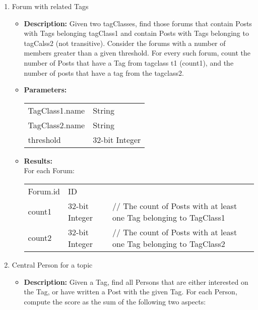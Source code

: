 {\begin{enumerate}
      \item Forum with related Tags 
            \begin{itemize}
                \item \textbf{Description:}
                  Given two tagClasses, find those forums that contain Posts with Tags belonging tagClass1 and contain
                  Posts with Tags belonging to tagCalss2 (not transitive). Consider the forums with a number of members
                  greater than a given threshold.
                  For every such forum, count the number of Posts  that have a Tag from tagclass t1 (count1), and the
                  number of posts that have a tag  from the tagclass2. 
                \item \textbf{Parameters:} \\
                    \begin{tabular}{ll}
                      TagClass1.name & String \\ 
                      TagClass2.name & String \\ 
                      threshold & 32-bit Integer \\
                    \end{tabular}
                \item \textbf{Results:} \\
                  For each Forum:
                    \begin{tabular}{lll}
                      Forum.id & ID & \\
                      count1 & 32-bit Integer & \parbox[t]{20cm}{ // The count of Posts with at least one Tag belonging
                        to TagClass1 \strut} \\
                      count2 & 32-bit Integer & \parbox[t]{20cm}{ // The count of Posts with at least one Tag belonging
                        to TagClass2 \strut} \\
                    \end{tabular}
                    \end{itemize}

      \item Central Person for a topic 
            \begin{itemize}
                \item \textbf{Description:}
                  Given a Tag, find all Persons that are either interested on the Tag, or have written a Post with the
                  given Tag. For each Person, compute the score as the sum of the following two aspects:


\end{itemize}
\end{enumerate}}

